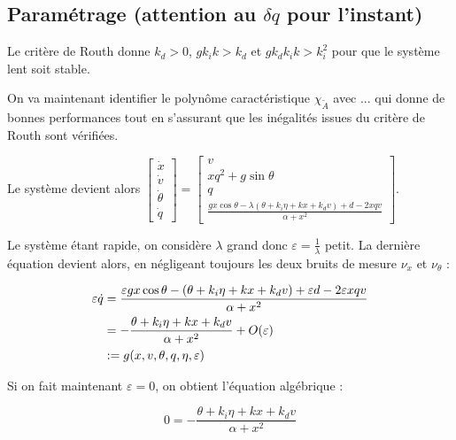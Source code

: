 \documentclass[10pt]{article}
\begin{document}
\subsection*{Paramétrage (attention au $\delta q$ pour l'instant)}

\noindent Le critère de Routh donne $k_d > 0$, $g k_i k > k_d$ et $g k_d k_i k > k_i^2$ pour que le système lent
soit stable.

\vspace{10px}

\noindent On va maintenant identifier le polynôme caractéristique $\chi_{\tilde A}$ avec ... qui donne de bonnes
performances tout en s'assurant que les inégalités issues du critère de Routh sont vérifiées.


\noindent Le système devient alors 
$\begin{bmatrix} 
	\dot x \\
	\dot v \\
	\dot \theta \\
	\dot q
\end{bmatrix} =
\begin{bmatrix} 
	v \\
	x q^2 + g \sin \theta \\
	q \\ 
	\frac{gx \cos \theta - \lambda ( \theta + k_i \eta + k x + k_d v ) + d - 2xqv}{\alpha + x^2}
\end{bmatrix}$.

\vspace{10px}

\noindent Le système étant rapide,
on considère $\lambda$ grand donc $\varepsilon = \frac{1}{\lambda}$ petit. La dernière équation devient alors,
en négligeant toujours les deux bruits de mesure $\nu_x$ et $\nu_\theta$ :

\begin{align}
	\varepsilon \dot q &= \frac{\varepsilon gx \cos \theta - ( \theta + k_i \eta + k x + k_d v ) +
	\varepsilon d - 2 \varepsilon xqv}{\alpha + x^2} \notag \\
	&= - \frac{\theta + k_i \eta + k x + k_d v}{\alpha + x^2} + O (\varepsilon) \notag \\
	&:= g (x, v, \theta, q, \eta, \varepsilon) \notag
\end{align}

\noindent Si on fait maintenant $\varepsilon = 0$, on obtient l'équation algébrique :

\[
	0 = - \frac{\theta + k_i \eta + k x + k_d v}{\alpha + x^2}
\]
\end{document}
